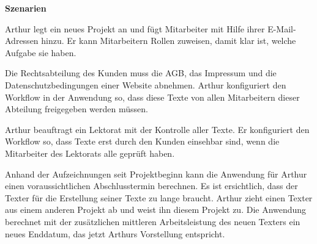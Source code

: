 \begin{multicols}{2}
\textbf{Szenarien}

Arthur legt ein neues Projekt an und fügt Mitarbeiter mit Hilfe ihrer E-Mail-Adressen hinzu. Er kann Mitarbeitern Rollen zuweisen, damit klar ist, welche Aufgabe sie haben. 

Die Rechtsabteilung des Kunden muss die AGB, das Impressum und die Datenschutzbedingungen einer Website abnehmen. Arthur konfiguriert den Workflow in der Anwendung so, dass diese Texte von allen Mitarbeitern dieser Abteilung freigegeben werden müssen.

Arthur beauftragt ein Lektorat mit der Kontrolle aller Texte. Er konfiguriert den Workflow so, dass Texte erst durch den Kunden einsehbar sind, wenn die Mitarbeiter des Lektorats alle geprüft haben.

Anhand der Aufzeichnungen seit Projektbeginn kann die Anwendung für Arthur einen voraussichtlichen Abschlusstermin berechnen. Es ist ersichtlich, dass der Texter für die Erstellung seiner Texte zu lange braucht. Arthur zieht einen Texter aus einem anderen Projekt ab und weist ihn diesem Projekt zu. Die Anwendung berechnet mit der zusätzlichen mittleren Arbeitsleistung des neuen Texters ein neues Enddatum, das jetzt Arthurs Vorstellung entspricht.

\end{multicols}

\pagebreak
